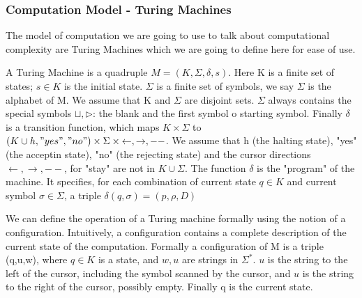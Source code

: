 \subsubsection{Computation Model - Turing Machines}
The model of computation we are going to use to talk about computational complexity are Turing Machines which we are going to define here for ease of use.\\
\begin{definition}
    A Turing Machine is a quadruple $M= (K, \Sigma, \delta, s)$. Here K is a finite set of states; $s \in K$ is the initial state. $\Sigma$ is a finite set of symbols, we say $\Sigma$ is the alphabet of M. We assume that K and $\Sigma$ are disjoint sets. $\Sigma$ always contains the special symbols $\sqcup, \triangleright$: the blank and the first symbol o starting symbol. Finally $\delta$ is a transition function, which maps $K\times \Sigma$ to $(K \cup {h,"yes","no"})\times \Sigma \times {\leftarrow, \rightarrow,-- }$. We assume that h (the halting state), "yes" (the acceptin state), "no" (the rejecting state) and the cursor directions $\leftarrow, \rightarrow, --$, for "stay" are not in $K \cup \Sigma$. The function $\delta$ is the "program" of the machine. It specifies, for each combination of current state $q\in K$ and current symbol $\sigma \in \Sigma$, a triple $\delta(q,\sigma) = (p,\rho,D)$
\end{definition}
\begin{definition}
    We can define the operation of a Turing machine formally using the notion of a configuration. Intuitively, a configuration contains a complete description of the current state of the computation. Formally a configuration of M is a triple (q,u,w), where $ q \in K$ is a state, and $w,u$ are strings in $\Sigma^*$. $u$ is the string to the left of the cursor, including the symbol scanned by the cursor, and $u$ is the string to the right of the cursor, possibly empty. Finally q is the current state. 
\end{definition}

